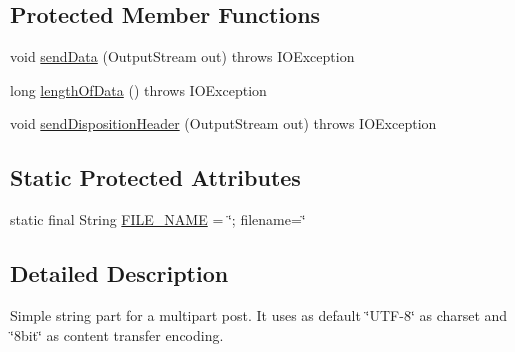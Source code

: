 \subsection*{Protected Member Functions}
\begin{DoxyCompactItemize}
\item 
void \hyperlink{classcom_1_1bluevia_1_1commons_1_1connector_1_1http_1_1multipart_1_1StringPart_ae55280faffff566f9b35c6847d3f3ceb}{sendData} (OutputStream out)  throws IOException 
\item 
long \hyperlink{classcom_1_1bluevia_1_1commons_1_1connector_1_1http_1_1multipart_1_1StringPart_a0cc77402946180db0552180a4cc8a29f}{lengthOfData} ()  throws IOException 
\item 
void \hyperlink{classcom_1_1bluevia_1_1commons_1_1connector_1_1http_1_1multipart_1_1StringPart_ab1e500ad3f3b3670f206104fca796fc9}{sendDispositionHeader} (OutputStream out)  throws IOException 
\end{DoxyCompactItemize}
\subsection*{Static Protected Attributes}
\begin{DoxyCompactItemize}
\item 
static final String \hyperlink{classcom_1_1bluevia_1_1commons_1_1connector_1_1http_1_1multipart_1_1StringPart_a75442e4228ebe966e5279c71f28fb11e}{FILE\_\-NAME} = \char`\"{}; filename=\char`\"{}
\end{DoxyCompactItemize}


\subsection{Detailed Description}
Simple string part for a multipart post. It uses as default \char`\"{}UTF-\/8\char`\"{} as charset and \char`\"{}8bit\char`\"{} as content transfer encoding. 

